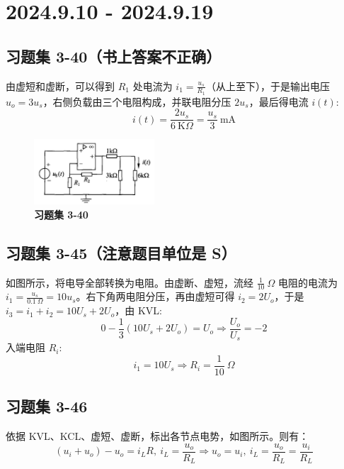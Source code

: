 \documentclass[UTF8]{report}
\def\mA{\ \mathrm{mA}}
\def\KO{\ \mathrm{K}\Omega}
\theoremstyle{MyLineTheoremStyle} %
\theoremstyle{MyBlockTheoremStyle} %
\theoremstyle{MySubsubsectionStyle} %
\begin{document}
\chapter{2024.9.10 - 2024.9.19}\thispagestyle{fancy}


\section{习题集 3-40（书上答案不正确）}

由虚短和虚断，可以得到 $R_1$ 处电流为 $i_1 = \frac{u_s}{R_1}$（从上至下），于是输出电压 $u_o = 3u_s$，右侧负载由三个电阻构成，并联电阻分压 $2u_s$，最后得电流 $i(t)$:
\begin{equation}
i(t) = \frac{2u_s}{6 \KO} = \frac{u_s}{3} \mA
\end{equation}

\begin{figure}[H]\centering
\includegraphics[width=0.4\textwidth]{assets/3/3-40.jpg}
\caption{\bfseries 习题集 3-40}
\end{figure}

\section{习题集 3-45（注意题目单位是 S）}

如图所示，将电导全部转换为电阻。由虚断、虚短，流经 $\frac{1}{10}\ \Omega$ 电阻的电流为 $i_1 = \frac{u_s}{0.1\ \Omega} = 10u_s$。右下角两电阻分压，再由虚短可得 $i_2 = 2U_o$，于是 $i_3 = i_1 + i_2 = 10 U_s + 2U_o$，由 KVL:
\begin{equation}
0 - \frac{1}{3}(10 U_s + 2U_o) = U_o \Longrightarrow  \frac{U_o}{U_s} = -2
\end{equation}
入端电阻 $R_i$: 
\begin{equation}
    i_1 = 10U_s \Longrightarrow  R_i = \frac{1}{10}\ \Omega
\end{equation}

\section{习题集 3-46}

依据 KVL、KCL、虚短、虚断，标出各节点电势，如图所示。则有：
\begin{equation}
(u_i+u_o)-u_o = i_LR,\ i_L = \frac{u_o}{R_L} \Longrightarrow u_o = u_i,\ i_L = \frac{u_o}{R_L} = \frac{u_i}{R_L}
\end{equation}
\end{document}
